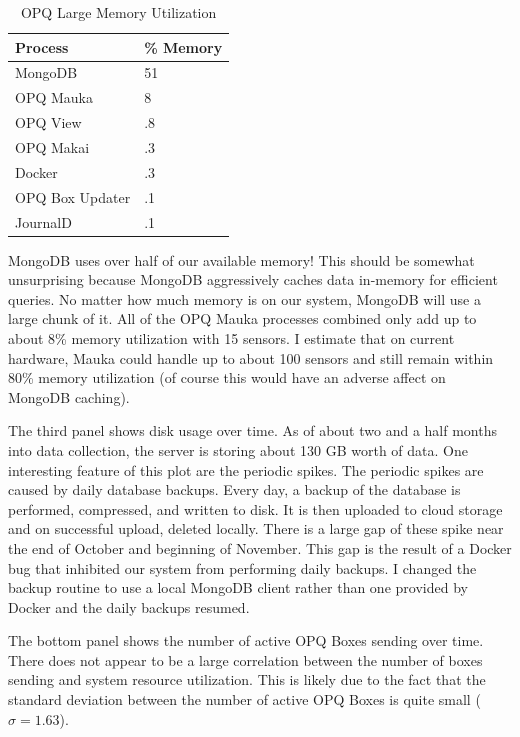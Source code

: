 \begin{table}[H]
    \centering
    \caption{OPQ Large Memory Utilization}
    \begin{tabularx}{\textwidth}{Xl}
        \toprule
        \textbf{Process} & \textbf{\% Memory} \\
        \midrule
        MongoDB & 51 \\
        OPQ Mauka & 8 \\
        OPQ View & .8 \\
        OPQ Makai & .3 \\
        Docker & .3 \\
        OPQ Box Updater & .1 \\
        JournalD & .1 \\
        \bottomrule
    \end{tabularx}
    \label{table:mem_utilization}
\end{table}

MongoDB uses over half of our available memory! This should be somewhat unsurprising because MongoDB aggressively caches data in-memory for efficient queries. No matter how much memory is on our system, MongoDB will use a large chunk of it. All of the OPQ Mauka processes combined only add up to about 8\% memory utilization with 15 sensors. I estimate that on current hardware, Mauka could handle up to about 100 sensors and still remain within 80\% memory utilization (of course this would have an adverse affect on MongoDB caching).

The third panel shows disk usage over time. As of about two and a half months into data collection, the server is storing about 130 GB worth of data. One interesting feature of this plot are the periodic spikes. The periodic spikes are caused by daily database backups. Every day, a backup of the database is performed, compressed, and written to disk. It is then uploaded to cloud storage and on successful upload, deleted locally. There is a large gap of these spike near the end of October and beginning of November. This gap is the result of a Docker bug that inhibited our system from performing daily backups. I changed the backup routine to use a local MongoDB client rather than one provided by Docker and the daily backups resumed.

The bottom panel shows the number of active OPQ Boxes sending over time. There does not appear to be a large correlation between the number of boxes sending and system resource utilization. This is likely due to the fact that the standard deviation between the number of active OPQ Boxes is quite small ($\sigma=1.63$).

